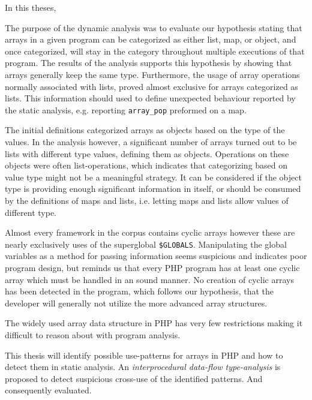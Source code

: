 

In this theses, 







The purpose of the dynamic analysis was to evaluate our hypothesis stating that arrays in a given program can be categorized as either list, map, or object, and once categorized, will stay in the category throughout multiple executions of that program. The results of the analysis supports this hypothesis by showing that arrays generally keep the same type. Furthermore, the usage of array operations normally associated with lists, proved almost exclusive for arrays categorized as lists. This information should used to define unexpected behaviour reported by the static analysis, e.g. reporting \texttt{array\_pop} preformed on a map. 

The initial definitions categorized arrays as objects based on the type of the values. In the analysis however, a significant number of arrays turned out to be lists with different type values, defining them as objects. Operations on these objects were often list-operations, which indicates that categorizing based on value type might not be a meaningful strategy. It can be considered if the object type is providing enough significant information in itself, or should be consumed by the definitions of maps and lists, i.e. letting maps and lists allow values of different type.

Almost every framework in the corpus contains cyclic arrays however these are nearly exclusively uses of the superglobal \texttt{\$GLOBALS}. Manipulating the global variables as a method for passing information seems suspicious and indicates poor program design, but reminds us that every PHP program has at least one cyclic array which must be handled in an sound manner. No creation of cyclic arrays has been detected in the program, which follows our hypothesis, that the developer will generally not utilize the more advanced array structures. 
 
 
 
The widely used array data structure in PHP has very few restrictions making it difficult to reason about with program analysis. 

This thesis will identify possible use-patterns for arrays in PHP 
and how to detect them in static analysis. 
An \emph{interprocedural data-flow type-analysis} is proposed to detect suspicious cross-use of the identified patterns.
And consequently evaluated.
